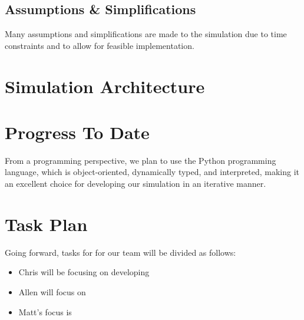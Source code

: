 \documentclass[12pt]{article}
\begin{document}
\subsection{Assumptions \& Simplifications}
Many assumptions and simplifications are made to the simulation due to time constraints and to allow for feasible implementation.
  

\section{Simulation Architecture}
\label{sec:architecture}

\section{Progress To Date}
\label{sec:progress}

From a programming perspective, we plan to use the Python programming language,
which is object-oriented, dynamically typed, and interpreted, making it an
excellent choice for developing our simulation in an iterative manner.

\section{Task Plan}
\label{sec:taskplan}

Going forward, tasks for for our team will be divided as follows:

\begin{itemize}
  \item Chris will be focusing on developing
  \item Allen will focus on
  \item Matt's focus is
\end{itemize}

\clearpage
{}

\end{document}

